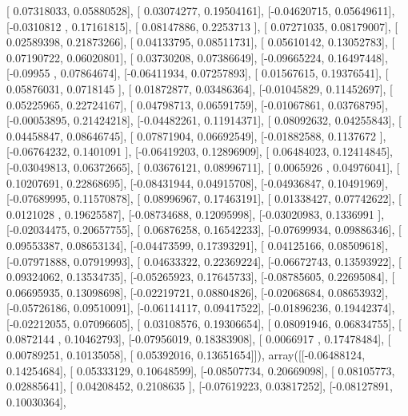 \documentclass{article}
\begin{document}
       [ 0.07318033,  0.05880528],
       [ 0.03074277,  0.19504161],
       [-0.04620715,  0.05649611],
       [-0.0310812 ,  0.17161815],
       [ 0.08147886,  0.2253713 ],
       [ 0.07271035,  0.08179007],
       [ 0.02589398,  0.21873266],
       [ 0.04133795,  0.08511731],
       [ 0.05610142,  0.13052783],
       [ 0.07190722,  0.06020801],
       [ 0.03730208,  0.07386649],
       [-0.09665224,  0.16497448],
       [-0.09955   ,  0.07864674],
       [-0.06411934,  0.07257893],
       [ 0.01567615,  0.19376541],
       [ 0.05876031,  0.0718145 ],
       [ 0.01872877,  0.03486364],
       [-0.01045829,  0.11452697],
       [ 0.05225965,  0.22724167],
       [ 0.04798713,  0.06591759],
       [-0.01067861,  0.03768795],
       [-0.00053895,  0.21424218],
       [-0.04482261,  0.11914371],
       [ 0.08092632,  0.04255843],
       [ 0.04458847,  0.08646745],
       [ 0.07871904,  0.06692549],
       [-0.01882588,  0.1137672 ],
       [-0.06764232,  0.1401091 ],
       [-0.06419203,  0.12896909],
       [ 0.06484023,  0.12414845],
       [-0.03049813,  0.06372665],
       [ 0.03676121,  0.08996711],
       [ 0.0065926 ,  0.04976041],
       [ 0.10207691,  0.22868695],
       [-0.08431944,  0.04915708],
       [-0.04936847,  0.10491969],
       [-0.07689995,  0.11570878],
       [ 0.08996967,  0.17463191],
       [ 0.01338427,  0.07742622],
       [ 0.0121028 ,  0.19625587],
       [-0.08734688,  0.12095998],
       [-0.03020983,  0.1336991 ],
       [-0.02034475,  0.20657755],
       [ 0.06876258,  0.16542233],
       [-0.07699934,  0.09886346],
       [ 0.09553387,  0.08653134],
       [-0.04473599,  0.17393291],
       [ 0.04125166,  0.08509618],
       [-0.07971888,  0.07919993],
       [ 0.04633322,  0.22369224],
       [-0.06672743,  0.13593922],
       [ 0.09324062,  0.13534735],
       [-0.05265923,  0.17645733],
       [-0.08785605,  0.22695084],
       [ 0.06695935,  0.13098698],
       [-0.02219721,  0.08804826],
       [-0.02068684,  0.08653932],
       [-0.05726186,  0.09510091],
       [-0.06114117,  0.09417522],
       [-0.01896236,  0.19442374],
       [-0.02212055,  0.07096605],
       [ 0.03108576,  0.19306654],
       [ 0.08091946,  0.06834755],
       [ 0.0872144 ,  0.10462793],
       [-0.07956019,  0.18383908],
       [ 0.0066917 ,  0.17478484],
       [ 0.00789251,  0.10135058],
       [ 0.05392016,  0.13651654]]), array([[-0.06488124,  0.14254684],
       [ 0.05333129,  0.10648599],
       [-0.08507734,  0.20669098],
       [ 0.08105773,  0.02885641],
       [ 0.04208452,  0.2108635 ],
       [-0.07619223,  0.03817252],
       [-0.08127891,  0.10030364],
\end{document}
